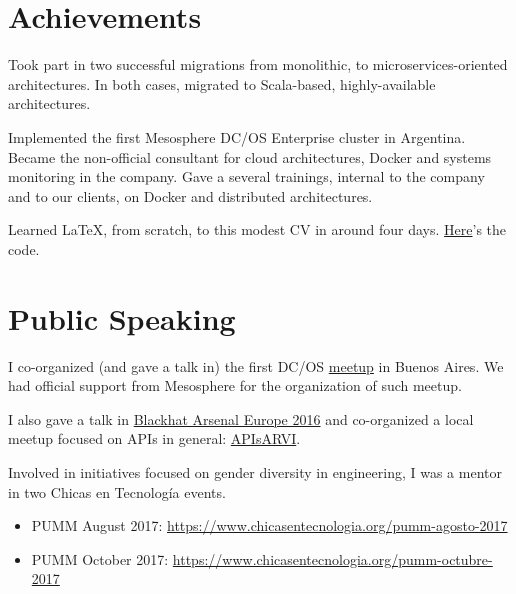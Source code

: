 \documentclass{vitae}
\begin{document}
\section*{Achievements}
Took part in two successful migrations from monolithic, to microservices-oriented architectures. In both cases, migrated to Scala-based, highly-available architectures.

Implemented the first Mesosphere DC/OS Enterprise cluster in Argentina. Became the non-official consultant for cloud architectures, Docker and systems monitoring in the company. Gave a several trainings, internal to the company and to our clients, on Docker and distributed architectures. 

Learned \LaTeX, from scratch, to this modest CV in around four days. \href{https://github.com/nicovillanueva/vitae}{\url{Here}}'s the code.

\section*{Public Speaking}
I co-organized (and gave a talk in) the first DC/OS \href{https://www.meetup.com/es-ES/mesos-dcos-argentina/events/234352452/}{meetup} in Buenos Aires. We had official support from Mesosphere for the organization of such meetup.

I also gave a talk in \href{https://www.blackhat.com/eu-16/presenters/Nicolas-Villanueva.html}{Blackhat Arsenal Europe 2016} and co-organized a local meetup focused on APIs in general: \href{https://www.meetup.com/APIsAR/events/243084908/}{APIsARVI}.

Involved in initiatives focused on gender diversity in engineering, I was a mentor in two Chicas en Tecnología events.
\begin{itemize}[noitemsep]
    \item PUMM August 2017: \url{https://www.chicasentecnologia.org/pumm-agosto-2017}
    \item PUMM October 2017: \url{https://www.chicasentecnologia.org/pumm-octubre-2017}
\end{itemize}

\newpage
\end{document}
